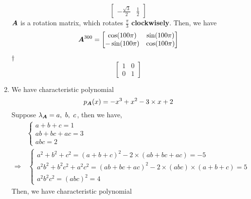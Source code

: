 \documentclass[a4paper,12pt]{article}
\begin{document}
\begin{enumerate}
\begin{equation}
\begin{bmatrix}
            -\frac{\sqrt{3}}{2} & \frac{1}{2}
        \end{bmatrix}
    \end{equation} $\boldsymbol{A}$ is a rotation matrix, which rotates $\frac{\pi}{3}$ \textbf{clockwisely}. Then, we have \begin{equation}
        \boldsymbol{A}^{300} = \begin{bmatrix}
            \cos(100\pi) & \sin(100\pi) \\
            -\sin(100\pi) & \cos(100\pi) \\
        \end{bmatrix}
    \end{equation}
    \begin{answer}{$\dag$}\begin{equation}
            \begin{bmatrix}
                1 & 0 \\
                0 & 1
            \end{bmatrix}
        \end{equation}
    \end{answer}
    \item We have characteristic polynomial \begin{equation}
        p_{\boldsymbol{A}}(x) = -x^3 + x^2 - 3 \times x + 2
    \end{equation} Suppose $\lambda_{\mat{A}} = a, \ b, \ c$, then we have, \begin{equation}
        \begin{aligned}
            & \begin{cases}
                a + b + c = 1 \\
                ab + bc + ac = 3 \\
                abc = 2
            \end{cases} \\
            \Rightarrow & \ \begin{cases}
                a^2 + b^2 + c^2 = (a + b + c)^2 - 2 \times (ab + bc + ac) = -5 \\
                a^2b^2 + b^2c^2 + a^2c^2 = (ab + bc + ac)^2 - 2 \times (abc) \times (a + b + c) = 5 \\
                a^2b^2c^2 = (abc)^2 = 4
            \end{cases}
        \end{aligned}
    \end{equation} Then, we have characteristic polynomial \begin{equation}

\end{equation}
\end{enumerate}
\end{document}
